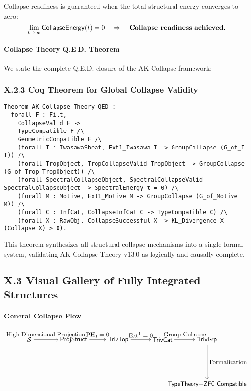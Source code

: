 \documentclass[11pt]{article}
\begin{document}
Collapse readiness is guaranteed when the total structural energy converges to zero:
\[
\lim_{t \to \infty} \mathsf{CollapseEnergy}(t) = 0 \quad \Rightarrow \quad \text{\textbf{Collapse readiness achieved}}.
\]

\paragraph{Collapse Theory Q.E.D. Theorem}

We state the complete Q.E.D. closure of the AK Collapse framework:

\subsubsection*{X.2.3 Coq Theorem for Global Collapse Validity}

\begin{lstlisting}[language=Coq]
Theorem AK_Collapse_Theory_QED :
  forall F : Filt,
    CollapseValid F ->
    TypeCompatible F /\
    GeometricCompatible F /\
    (forall I : IwasawaSheaf, Ext1_Iwasawa I -> GroupCollapse (G_of_I I)) /\
    (forall TropObject, TropCollapseValid TropObject -> GroupCollapse (G_of_Trop TropObject)) /\
    (forall SpectralCollapseObject, SpectralCollapseValid SpectralCollapseObject -> SpectralEnergy t = 0) /\
    (forall M : Motive, Ext1_Motive M -> GroupCollapse (G_of_Motive M)) /\
    (forall C : InfCat, CollapseInfCat C -> TypeCompatible C) /\
    (forall X : RawObj, CollapseSuccessful X -> KL_Divergence X (Collapse X) > 0).
\end{lstlisting}

This theorem synthesizes all structural collapse mechanisms into a single formal system, validating AK Collapse Theory v13.0 as logically and causally complete.



\subsection*{X.3 Visual Gallery of Fully Integrated Structures}

\paragraph{General Collapse Flow}
\[
\begin{tikzpicture}[node distance=2.5cm, auto]
  \node (S) {$\mathcal{S}$};
  \node (P) [right of=S] {$\mathsf{ProjStruct}$};
  \node (T) [right of=P] {$\mathsf{TrivTop}$};
  \node (C) [right of=T] {$\mathsf{TrivCat}$};
  \node (G) [right of=C] {$\mathsf{TrivGrp}$};
  \node (F) [below of=G] {$\mathsf{TypeTheory{-}ZFC\ Compatible}$};
  \draw[->] (S) to node {High-Dimensional Projection} (P);
  \draw[->] (P) to node {$\mathrm{PH}_1 = 0$} (T);
  \draw[->] (T) to node {$\mathrm{Ext}^1 = 0$} (C);
  \draw[->] (C) to node {Group Collapse} (G);
  \draw[->] (G) to node {Formalization} (F);
\end{tikzpicture}
\]
\end{document}
